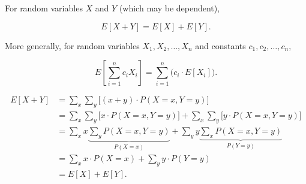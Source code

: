 \documentclass{article}
\begin{document}
For random variables \(X\) and \(Y\) (which may be dependent),

\[E[X+Y] = E[X]+E[Y].\]

More generally, for random variables \(X_1,X_2,\ldots,X_n\) and constants \(c_1,c_2,\ldots,c_n,\)

\[E\left[\sum_{i=1}^{n} c_i X_i\right] = \sum_{i=1}^{n} \big(c_i \cdot E\left[X_i\right]\big). \]

\[\begin{align*} E[X+Y] &= \sum_{x}\sum_{y} \big[(x+y)\cdot P(X=x,Y=y)\big] \\ &=\sum_{x}\sum_{y} \big[x\cdot P(X=x,Y=y)\big] + \sum_{x}\sum_{y} \big[y\cdot P(X=x,Y=y)\big] \\ &=\sum_{x}x\underbrace{\sum_{y} P(X=x,Y=y)}_{P(X=x)} + \sum_{y}y\underbrace{\sum_{x} P(X=x,Y=y)}_{P(Y=y)} \\ &=\sum_{x}x\cdot P(X=x) + \sum_{y}y \cdot P(Y=y) \\ &=E[X] + E[Y]. \end{align*}\]
\end{document}
